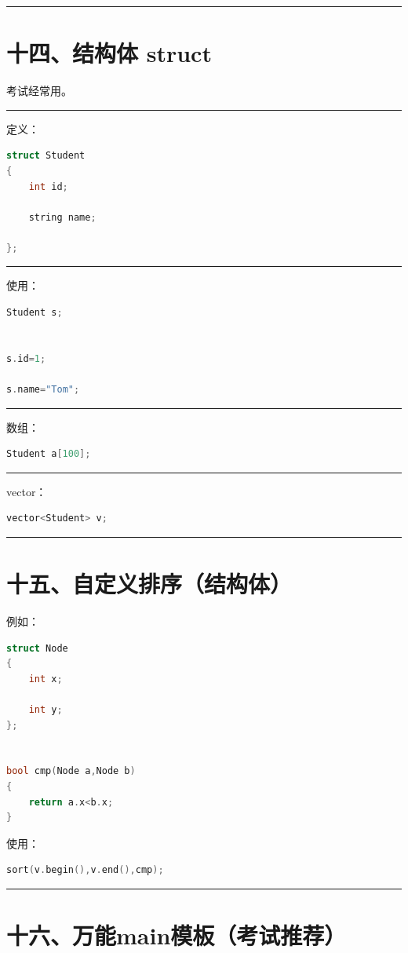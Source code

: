 \documentclass[10pt,twocolumn]{extarticle}
\begin{document}
\noindent\rule{\linewidth}{0.4pt}

\section{十四、结构体 struct}

考试经常用。

\noindent\rule{\linewidth}{0.4pt}

定义：
\begin{lstlisting}[language=C++]
struct Student
{
    int id;

    string name;

};
\end{lstlisting}

\noindent\rule{\linewidth}{0.4pt}

使用：
\begin{lstlisting}[language=C++]
Student s;


s.id=1;

s.name="Tom";
\end{lstlisting}

\noindent\rule{\linewidth}{0.4pt}

数组：
\begin{lstlisting}[language=C++]
Student a[100];
\end{lstlisting}

\noindent\rule{\linewidth}{0.4pt}

vector：
\begin{lstlisting}[language=C++]
vector<Student> v;
\end{lstlisting}

\noindent\rule{\linewidth}{0.4pt}

\section{十五、自定义排序（结构体）}

例如：
\begin{lstlisting}[language=C++]
struct Node
{
    int x;

    int y;
};


bool cmp(Node a,Node b)
{
    return a.x<b.x;
}
\end{lstlisting}
使用：
\begin{lstlisting}[language=C++]
sort(v.begin(),v.end(),cmp);
\end{lstlisting}

\noindent\rule{\linewidth}{0.4pt}

\section{十六、万能main模板（考试推荐）}
\end{document}
